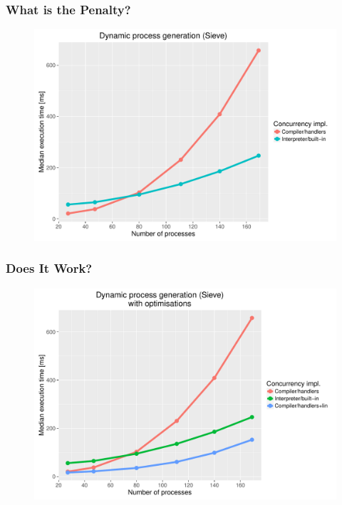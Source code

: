 \documentclass[10pt,compress]{beamer}
\begin{document}
\begin{frame}
  \frametitle{What is the Penalty?}
  \begin{figure}
    \centering
    \includegraphics[scale=0.40]{figures/sieve_compiler-interpreter.pdf}
  \end{figure}
\end{frame}


\begin{frame}
  \frametitle{Does It Work?}
  \begin{figure}
    \centering
    \includegraphics[scale=0.45]{figures/sieve_recovered.pdf}
  \end{figure}
\end{frame}
\end{document}
